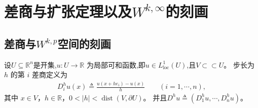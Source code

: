 \documentclass[../../main.tex]{subfiles}
\begin{document}
\section{差商与扩张定理以及$W^{k,\infty}$的刻画}\label{section:ch05-延拓}

\subsection{差商与$W^{k,p}$空间的刻画}\label{subsubsection:ch05-差商W1p}

\begin{definition}\label{definition:ch05-差商}
设$U\subseteq \mathbb{R}^n$是开集,$u:U\to\mathbb{R}$ 为局部可和函数,即$u\in L_{\text{loc}}^1(U)$,且$V\subset \subset U$。
步长为 $h$ 的第 $i$ 差商定义为
\begin{align*}
D_{i}^{h}u(x)\triangleq \frac{u(x+he_{i})-u(x)}{h}\qquad (i=1,\cdots,n),
\end{align*}
其中 $x\in V$，$h\in\mathbb{R}$，$0<|h|<\operatorname{dist}(V,\partial U)$。
并且$D^{h}u\triangleq(D_{1}^{h}u,\cdots,D_{n}^{h}u)$。
\end{definition}
\end{document}

